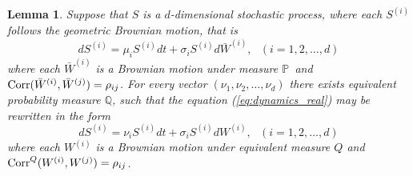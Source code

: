 \documentclass[a4paper,12pt, oneside]{book}
\newtheorem{lemma}[thm]{Lemma}
\theoremstyle{definition}
\theoremstyle{remark}
\def\P{{\mathbb{P}}\,}
\def\Corr{{\hbox{Corr}}}
\begin{document}
\begin{lemma}
\label{lemma:measure_change}
 Suppose that $S$ is a $d$-dimensional stochastic process, where each $S^{(i)}$ follows the geometric Brownian motion, that is
 \begin{equation}
  \label{eq:dynamics_real}
  dS^{(i)} = \mu_i S^{(i)} dt + \sigma_i S^{(i)} d\bar{W}^{(i)},\ \ \ (i=1,2,\ldots,d)
 \end{equation}
 where each $\bar{W}^{(i)}$ is a Brownian motion under measure $\P$ and $\Corr(\bar{W}^{(i)}, \bar{W}^{(j)}) = \rho_{ij}$. For every vector $(\nu_1, \nu_2, \ldots, \nu_d)$ there exists equivalent probability measure $\mathbb{Q}$, such that the equation (\ref{eq:dynamics_real}) may be rewritten in the form
  \begin{equation}
  dS^{(i)} = \nu_i S^{(i)} dt + \sigma_i S^{(i)} dW^{(i)},\ \ \ (i=1,2,\ldots,d)
 \end{equation}
 where each $W^{(i)}$ is a Brownian motion under equivalent measure $Q$ and\\ $\Corr^Q(W^{(i)}, W^{(j)}) = \rho_{ij}$.
\end{lemma}
\end{document}
